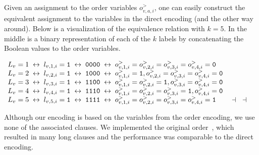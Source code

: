 \documentclass[10pt,usletter]{article}
\makeatletter
\newenvironment{myquote}{\begin{center}
    \begin{minipage}{.80\linewidth}}{\end{minipage}\end{center}}
\DeclareRobustCommand{\exqed}{\ifmmode
    \eqno \def\@badmath{$$}\let\eqno\relax \let\leqno\relax \let\veqno\relax
    \hbox{\ensuremath{\dashv}}\else
    \leavevmode\unskip\penalty9999 \hbox{}\nobreak\hfill
    \quad\hbox{\ensuremath{\dashv}}\fi
}
\theoremstyle{remark}
\newenvironment{examplenoqed}{\begin{ex}}{\end{ex}}
\makeatother
\begin{document}
\begin{examplenoqed} 
Given an assignment to the order variables $o^>_{v,a,i}$, one can easily construct the equivalent assignment to the variables in the 
direct encoding (and the other way around). Below is a visualization of the equivalence relation with $k=5$. In the middle is a binary 
representation of each of the $k$ labels by concatenating the Boolean values to the order variables.
\begin{myquote}
$\begin{array}[b]{c@{\;\;}c@{\;\;}c@{\;\;}c@{\;\;}c@{\;\;}c@{\;\;}l}
L_v = 1 &\leftrightarrow& l_{v,1,i} = {\tt 1} &\leftrightarrow&  {\tt 0000} &\leftrightarrow&  o^>_{v,1,i} = o^>_{v,2,i} = o^>_{v,3,i} = o^>_{v,4,i} = {\tt 0} \\
L_v = 2 &\leftrightarrow& l_{v,2,i} = {\tt 1} & \leftrightarrow  & {\tt 1000} & \leftrightarrow & o^>_{v,1,i} = {\tt 1}, o^>_{v,2,i} = o^>_{v,3,i} = o^>_{v,4,i} = {\tt 0} \\
L_v = 3 &\leftrightarrow& l_{v,3,i} = {\tt 1} & \leftrightarrow & {\tt 1100} &  \leftrightarrow & o^>_{v,1,i} =  o^>_{v,2,i} = {\tt 1}, o^>_{v,3,i} = o^>_{v,4,i} = {\tt 0} \\
L_v = 4 &\leftrightarrow& l_{v,4,i} = {\tt 1} & \leftrightarrow  & {\tt 1110} &  \leftrightarrow & o^>_{v,1,i} = o^>_{v,2,i} = o^>_{v,3,i} = {\tt 1}, o^>_{v,4,i} = {\tt 0} \\
L_v = 5 &\leftrightarrow& l_{v,5,i} = {\tt 1} & \leftrightarrow & {\tt 1111} &  \leftrightarrow & o^>_{v,1,i} = o^>_{v,2,i} = o^>_{v,3,i} = o^>_{v,4,i} = {\tt 1}
\end{array}$\exqed
\end{myquote}
\end{examplenoqed}

\medskip

Although our encoding is based on the variables from the order encoding, 
we use none of the associated clauses. We implemented the original 
order~\cite{TamuraTagaKitagawaBanbara09}, which resulted 
in many long clauses and the performance was comparable to the direct
encoding.
\end{document}
